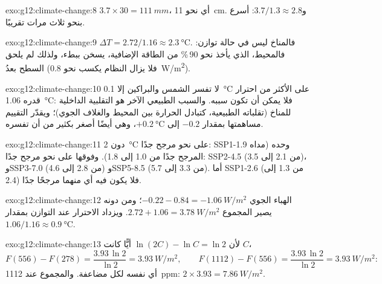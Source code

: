\begin{solution}{exo:g12:climate-change:8}
$3.7 \times 30 = \qty{111}{mm}$، أي نحو \qty{11}{cm}. و$3.7/1.3 \approx 2.8$:
أسرع بنحو ثلاث مرات تقريبًا.
\end{solution}

\begin{solution}{exo:g12:climate-change:9}
$\Delta T = 2.72/1.16 \approx \qty{2.3}{\degreeCelsius}$. فالمناخ ليس
في حالة توازن: فالمحيط، الذي يأخذ نحو 90\,\% من الطاقة الإضافية،
يسخن ببطء، ولذلك لم يلحق السطح بعدُ  (فلا يزال
النظام يكسب نحو \qty{0.8}{W/m^2}).
\end{solution}

\begin{solution}{exo:g12:climate-change:10}
لا تفسر الشمس والبراكين إلا \qty{0.1}{\degreeCelsius} على الأكثر من
احترار قدره \qty{1.06}{\degreeCelsius}: فلا يمكن أن تكون سببه. والسبب الطبيعي
الآخر هو التقلبية الداخلية للمناخ (تقلباته
الطبيعية، كتبادل الحرارة بين المحيط والغلاف الجوي)؛ ويقدّر
التقييم مساهمتها بمقدار $-0.2$ إلى $+\qty{0.2}{\degreeCelsius}$،
وهي أيضًا أصغر بكثير من أن تفسره.
\end{solution}

\begin{solution}{exo:g12:climate-change:11}
دون \qty{2}{\degreeCelsius} على نحو مرجح جدًا: SSP1-1.9 وحده (مداه المرجح
جدًا من 1.0 إلى 1.8). وفوقها على نحو مرجح جدًا: SSP2-4.5 (من 2.1 إلى 3.5)، وSSP3-7.0 (من 2.8 إلى 4.6)
وSSP5-8.5 (من 3.3 إلى 5.7). أما SSP1-2.6 (من 1.3 إلى 2.4) فلا يكون فيه أي منهما مرجحًا جدًا.
\end{solution}

\begin{solution}{exo:g12:climate-change:12}
 الهباء الجوي $-0.22 - 0.84 = \qty{-1.06}{W/m^2}$؛ ومن دونه يصير
المجموع $2.72 + 1.06 = \qty{3.78}{W/m^2}$. ويزداد الاحترار عند التوازن
بمقدار $1.06/1.16 \approx \qty{0.9}{\degreeCelsius}$.
\end{solution}

\begin{solution}{exo:g12:climate-change:13}
لأن $\ln(2C) - \ln C = \ln 2$ أيًّا كانت $C$،
\[
  F(556) - F(278) = \frac{3.93\,\ln 2}{\ln 2} = \qty{3.93}{W/m^2}, \qquad
  F(1112) - F(556) = \frac{3.93\,\ln 2}{\ln 2} = \qty{3.93}{W/m^2}:
\]
أي  نفسه لكل مضاعفة. والمجموع عند \qty{1112}{ppm}: $2 \times 3.93 =
\qty{7.86}{W/m^2}$.
\end{solution}

